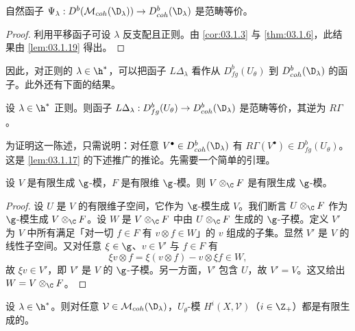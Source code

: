 \begin{lemma}\label{lem:03.1.20}
自然函子 $\Psi_\lambda:D^b(\mathcal{M}_{coh}(\D_\lambda))\to D^b_{coh}(\D_\lambda)$ 是范畴等价。
\end{lemma}

\begin{proof}
利用平移函子可设 $\lambda$ 反支配且正则。由 \ref{cor:03.1.3} 与 \ref{thm:03.1.6}，此结果由 \ref{lem:03.1.19} 得出。
\end{proof}

因此，对正则的 $\lambda\in\h^*$，可以把函子 $L\Delta_\lambda$ 看作从 $D^b_{fg}(U_\theta)$ 到 $D^b_{coh}(\D_\lambda)$ 的函子。此外还有下面的结果。

\begin{theorem}\label{thm:03.1.21}
设 $\lambda\in\h^*$ 正则。则函子 $L\Delta_\lambda:D^b_{fg}(U_\theta)\to D^b_{coh}(\D_\lambda)$ 是范畴等价，其逆为 $R\Gamma$。
\end{theorem}

为证明这一陈述，只需说明：对任意 $V^\bullet\in D^b_{coh}(\D_\lambda)$ 有 $R\Gamma(V^\bullet)\in D^b_{fg}(U_\theta)$。这是 \ref{lem:03.1.17} 的下述推广的推论。先需要一个简单的引理。

\begin{lemma}\label{lem:03.1.22}
设 $V$ 是有限生成 $\g$-模，$F$ 是有限维 $\g$-模。则 $V\otimes_\C F$ 是有限生成 $\g$-模。
\end{lemma}

\begin{proof}
设 $U$ 是 $V$ 的有限维子空间，它作为 $\g$-模生成 $V$。我们断言 $U\otimes_\C F$ 作为 $\g$-模生成 $V\otimes_\C F$。设 $W$ 是 $V\otimes_\C F$ 中由 $U\otimes_\C F$ 生成的 $\g$-子模。定义 $V'$ 为 $V$ 中所有满足「对一切 $f\in F$ 有 $v\otimes f\in W$」的 $v$ 组成的子集。显然 $V'$ 是 $V$ 的线性子空间。又对任意 $\xi\in\g$、$v\in V'$ 与 $f\in F$ 有
$$\xi v\otimes f=\xi(v\otimes f)-v\otimes\xi f\in W,$$
故 $\xi v\in V'$，即 $V'$ 是 $V$ 的 $\g$-子模。另一方面，$V'$ 包含 $U$，故 $V'=V$。这又给出 $W=V\otimes_\C F$。
\end{proof}

\begin{lemma}\label{lem:03.1.23}
设 $\lambda\in\h^*$。则对任意 $\mathcal{V}\in\mathcal{M}_{coh}(\D_\lambda)$，$U_\theta$-模 $H^i(X,\mathcal{V})$（$i\in\Z_+$）都是有限生成的。
\end{lemma}

